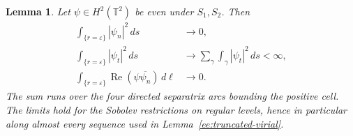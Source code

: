 \documentclass[reqno,11pt]{amsart}
\numberwithin{equation}{section}
\newtheorem{lemma}[theorem]{Lemma}
\theoremstyle{remark}
\begin{document}
\begin{lemma}\label{ee:gradient-traces}
Let $\psi\in H^2(\mathbb T^2)$ be even under $S_1,S_2$. Then
\begin{align}\label{ee:normal-trace-limit}
 \int_{\{r=\varepsilon\}}|\psi_n|^2\,ds&\longrightarrow0,\\
 \int_{\{r=\varepsilon\}}|\psi_t|^2\,ds
   &\longrightarrow\sum_\gamma\int_\gamma|\psi_t|^2\,ds<\infty,
 \label{ee:tangent-trace-limit}\\
 \int_{\{r=\varepsilon\}}
       \operatorname{Re}(\psi\overline{\psi_n})\,d\ell
   &\longrightarrow0.\label{ee:first-trace-limit}
\end{align}
The sum runs over the four directed separatrix arcs bounding the
positive cell. The limits hold for the Sobolev restrictions on
regular levels, hence in particular along almost every sequence
used in Lemma~\ref{ee:truncated-virial}.
\end{lemma}
\end{document}
